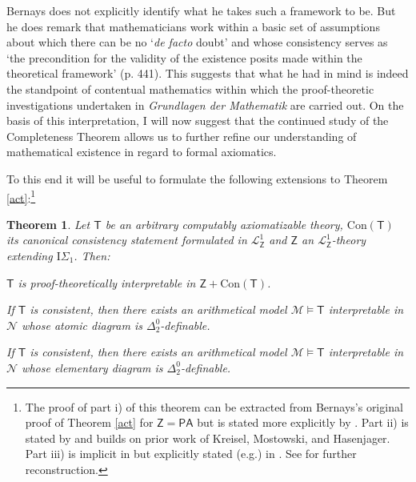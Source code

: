 \documentclass[11pt,fleqn,leqno]{article}
\newtheorem{theorem}{Theorem}[section]
\begin{document}
Bernays does not explicitly identify what he takes such a framework to be.   But he does remark that mathematicians work within a basic set of assumptions about which there can be no `\textsl{de facto} doubt'  and whose consistency serves as `the precondition for the validity of the existence posits made within the theoretical framework' (p. 441).  This suggests that what he had in mind is indeed the standpoint of contentual mathematics within which the proof-theoretic investigations undertaken in \textsl{Grundlagen der Mathematik} are carried out.  On the basis of this interpretation, I will now suggest that the continued study of the Completeness Theorem allows us to further refine our understanding of mathematical existence in regard to formal axiomatics.   

To this end it will be useful to formulate the following extensions to Theorem \ref{act}:\footnote{The proof of part i) of this theorem can be extracted from Bernays's original proof of Theorem \ref{act} for $\mathsf{Z} = \mathsf{PA}$ but is stated more explicitly by \citet{Feferman1960}.   Part ii) is stated by \citet[p. 394]{Kleene1952} and builds on prior work of Kreisel, Mostowski, and Hasenjager.   Part iii) is implicit in \citep{Feferman1960} but explicitly stated (e.g.) in \citep{Kaye1991}.  See \citep{Dean2019a} for further reconstruction.}
\begin{theorem}
\label{act2}
Let $\mathsf{T}$ be an arbitrary computably axiomatizable theory, $\mathrm{Con}(\mathsf{T})$ its canonical consistency statement formulated in $\mathcal{L}^1_{\mathsf{Z}}$ and $\mathsf{Z}$ an $\mathcal{L}^1_{\mathsf{Z}}$-theory extending $\mathrm{I}\Sigma_1$.  Then:
\begin{compactenum}[i)]
\item $\mathsf{T}$ is proof-theoretically interpretable in $\mathsf{Z}+\mathrm{Con}(\mathsf{T})$.
\item If $\mathsf{T}$ is consistent, then there exists an arithmetical model $\mathcal{M} \models \mathsf{T}$  interpretable in $\mathcal{N}$ whose atomic diagram is $\Delta^0_2$-definable.
\item If $\mathsf{T}$ is consistent, then there exists an arithmetical model $\mathcal{M} \models \mathsf{T}$ interpretable in $\mathcal{N}$ whose elementary diagram is $\Delta^0_2$-definable.
\end{compactenum}
\end{theorem}
\noindent 
\end{document}
